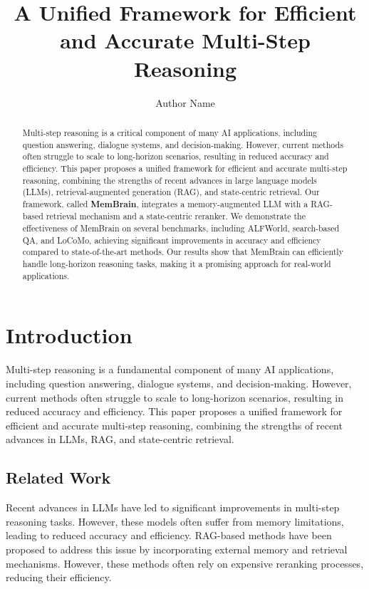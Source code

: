 \documentclass{article}
\begin{document}
\title{A Unified Framework for Efficient and Accurate Multi-Step Reasoning}

\author{Author Name}

\maketitle

\begin{abstract}
Multi-step reasoning is a critical component of many AI applications, including question answering, dialogue systems, and decision-making. However, current methods often struggle to scale to long-horizon scenarios, resulting in reduced accuracy and efficiency. This paper proposes a unified framework for efficient and accurate multi-step reasoning, combining the strengths of recent advances in large language models (LLMs), retrieval-augmented generation (RAG), and state-centric retrieval. Our framework, called \textbf{MemBrain}, integrates a memory-augmented LLM with a RAG-based retrieval mechanism and a state-centric reranker. We demonstrate the effectiveness of MemBrain on several benchmarks, including ALFWorld, search-based QA, and LoCoMo, achieving significant improvements in accuracy and efficiency compared to state-of-the-art methods. Our results show that MemBrain can efficiently handle long-horizon reasoning tasks, making it a promising approach for real-world applications.
\end{abstract}

\section{Introduction}

Multi-step reasoning is a fundamental component of many AI applications, including question answering, dialogue systems, and decision-making. However, current methods often struggle to scale to long-horizon scenarios, resulting in reduced accuracy and efficiency. This paper proposes a unified framework for efficient and accurate multi-step reasoning, combining the strengths of recent advances in LLMs, RAG, and state-centric retrieval.

\subsection{Related Work}

Recent advances in LLMs have led to significant improvements in multi-step reasoning tasks. However, these models often suffer from memory limitations, leading to reduced accuracy and efficiency. RAG-based methods have been proposed to address this issue by incorporating external memory and retrieval mechanisms. However, these methods often rely on expensive reranking processes, reducing their efficiency.
\end{document}
